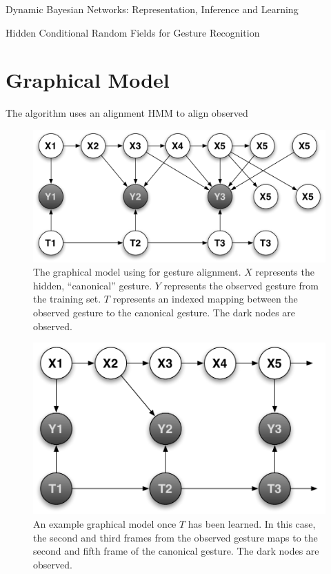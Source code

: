 \documentclass{article}
\begin{document}
Dynamic Bayesian Networks: Representation, Inference and Learning \cite{Muphy2002}

Hidden Conditional Random Fields for Gesture Recognition \cite{Wang2006}


\section{Graphical Model}

The algorithm uses an alignment HMM to align observed 

\begin{figure}
\begin{centering}
\includegraphics[width=0.65\columnwidth]{figures/model_tau_unobserved.pdf}

\caption{The graphical model using for gesture alignment. $X$ represents the
hidden, ``canonical'' gesture. $Y$ represents the observed gesture from the
training set. $T$ represents an indexed mapping between the observed gesture
to the canonical gesture. The dark nodes are observed.
\label{figure:model_tau_unobserved}}

\end{centering}
\end{figure}



\begin{figure}
\begin{centering}
\includegraphics[width=0.65\columnwidth]{figures/model_tau_observed.pdf}

\caption{An example graphical model once $T$ has been learned. In this case,
the second and third frames from the observed gesture maps to the second and
fifth frame of the canonical gesture. The dark nodes are observed.
\label{figure:model_tau_observed}}

\end{centering}
\end{figure}
\end{document}
